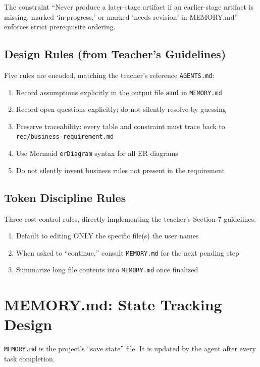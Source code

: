 \documentclass[12pt,a4paper]{article}
\begin{document}
The constraint ``Never produce a later-stage artifact if an earlier-stage artifact is missing, marked `in-progress,' or marked `needs revision' in MEMORY.md'' enforces strict prerequisite ordering.

\subsection{Design Rules (from Teacher's Guidelines)}

Five rules are encoded, matching the teacher's reference \texttt{AGENTS.md}:

\begin{enumerate}
    \item Record assumptions explicitly in the output file \textbf{and} in \texttt{MEMORY.md}
    \item Record open questions explicitly; do not silently resolve by guessing
    \item Preserve traceability: every table and constraint must trace back to \texttt{req/business-requirement.md}
    \item Use Mermaid \texttt{erDiagram} syntax for all ER diagrams
    \item Do not silently invent business rules not present in the requirement
\end{enumerate}

\subsection{Token Discipline Rules}

Three cost-control rules, directly implementing the teacher's Section 7 guidelines:

\begin{enumerate}
    \item Default to editing ONLY the specific file(s) the user names
    \item When asked to ``continue,'' consult \texttt{MEMORY.md} for the next pending step
    \item Summarize long file contents into \texttt{MEMORY.md} once finalized
\end{enumerate}

\section{MEMORY.md: State Tracking Design}
\label{sec:memory}

\texttt{MEMORY.md} is the project's ``save state'' file. It is updated by the agent after every task completion.
\end{document}
